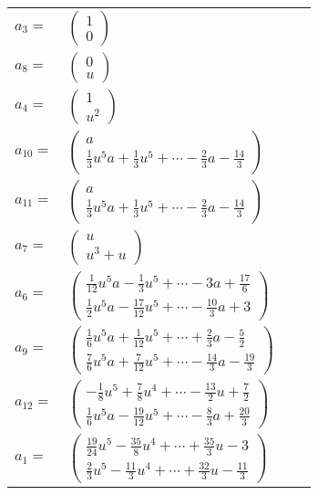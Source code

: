 \documentclass[1p]{elsarticle_modified}
\theoremstyle{definition}
\begin{document}
\begin{tabular}{m{7pt} m{180pt} m{7pt} m{180pt} }
\flushright $a_{3}=$&$\begin{pmatrix}1\\0\end{pmatrix}$ \\
\flushright $a_{8}=$&$\begin{pmatrix}0\\u\end{pmatrix}$ \\
\flushright $a_{4}=$&$\begin{pmatrix}1\\u^2\end{pmatrix}$ \\
\flushright $a_{10}=$&$\begin{pmatrix}a\\\frac{1}{3} u^5 a+\frac{1}{3} u^5+\cdots-\frac{2}{3} a-\frac{14}{3}\end{pmatrix}$ \\
\flushright $a_{11}=$&$\begin{pmatrix}a\\\frac{1}{3} u^5 a+\frac{1}{3} u^5+\cdots-\frac{2}{3} a-\frac{14}{3}\end{pmatrix}$ \\
\flushright $a_{7}=$&$\begin{pmatrix}u\\u^3+u\end{pmatrix}$ \\
\flushright $a_{6}=$&$\begin{pmatrix}\frac{1}{12} u^5 a-\frac{1}{3} u^5+\cdots-3 a+\frac{17}{6}\\\frac{1}{2} u^5 a-\frac{17}{12} u^5+\cdots-\frac{10}{3} a+3\end{pmatrix}$ \\
\flushright $a_{9}=$&$\begin{pmatrix}\frac{1}{6} u^5 a+\frac{1}{12} u^5+\cdots+\frac{2}{3} a-\frac{5}{2}\\\frac{7}{6} u^5 a+\frac{7}{12} u^5+\cdots-\frac{14}{3} a-\frac{19}{3}\end{pmatrix}$ \\
\flushright $a_{12}=$&$\begin{pmatrix}-\frac{1}{8} u^5+\frac{7}{8} u^4+\cdots-\frac{13}{2} u+\frac{7}{2}\\\frac{1}{6} u^5 a-\frac{19}{12} u^5+\cdots-\frac{8}{3} a+\frac{20}{3}\end{pmatrix}$ \\
\flushright $a_{1}=$&$\begin{pmatrix}\frac{19}{24} u^5-\frac{35}{8} u^4+\cdots+\frac{35}{3} u-3\\\frac{2}{3} u^5-\frac{11}{3} u^4+\cdots+\frac{32}{3} u-\frac{11}{3}\end{pmatrix}$ \\

\end{tabular}
\end{document}
